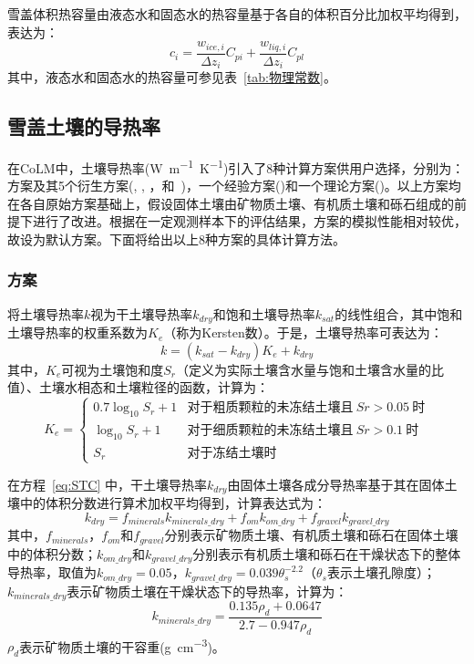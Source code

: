 雪盖体积热容量由液态水和固态水的热容量基于各自的体积百分比加权平均得到，表达为：
\begin{equation}
c_{i}=\frac{w_{ice, i}}{\Delta z_{i}} C_{pi}+\frac{w_{liq, i}}{\Delta z_{i}} C_{pl}
\end{equation}
其中，液态水和固态水的热容量可参见表~\ref{tab:物理常数}。

\subsection{雪盖土壤的导热率}

在CoLM中，土壤导热率(\unit{W.m^{-1}.K^{-1}})引入了8种计算方案供用户选择，分别为：\citet{Johansen1975}方案及其5个衍生方案(\citet{farouki1981thermal}, \citet{cote2005}, \citet{balland2005}，\citet{lu2007improved}和~\citet{Yan2019thermal})，一个经验方案(\citet{tarnawski2012series})和一个理论方案(\citet{de1963thermal})。以上方案均在各自原始方案基础上，假设固体土壤由矿物质土壤、有机质土壤和砾石组成的前提下进行了改进。根据\citep{dai2019evaluation}在一定观测样本下的评估结果，\citet{balland2005}方案的模拟性能相对较优，故设为默认方案。下面将给出以上8种方案的具体计算方法。

\subsubsection{\citet{Johansen1975}方案}
\citet{Johansen1975}将土壤导热率$k$视为干土壤导热率$k_{dry}$和饱和土壤导热率$k_{sat}$的线性组合，其中饱和土壤导热率的权重系数为$K_e$（称为Kersten数）。于是，土壤导热率可表达为：
\begin{equation}\label{eq:STC}
k=(k_{sat}-k_{dry})K_e+k_{dry}
\end{equation}
其中，$K_e$可视为土壤饱和度$S_r$（定义为实际土壤含水量与饱和土壤含水量的比值）、土壤水相态和土壤粒径的函数，计算为：
\begin{equation}
K_e=\begin{cases}
0.7\log_{10}S_r+1 & \text {对于粗质颗粒的未冻结土壤且}\ Sr>0.05\ \text {时} \\ 
\log_{10}S_r+1 & \text {对于细质颗粒的未冻结土壤且}\ Sr>0.1\ \text {时} \\ 
S_r & \text {对于冻结土壤时}
\end{cases}
\end{equation}

在方程~\eqref{eq:STC} 中，干土壤导热率$k_{dry}$由固体土壤各成分导热率基于其在固体土壤中的体积分数进行算术加权平均得到，计算表达式为：
\begin{equation}\label{eq:STC_dry}
k_{dry}=f_{minerals}k_{minerals\_dry}+f_{om}k_{om\_dry}+f_{gravel}k_{gravel\_dry}
\end{equation}
其中，$f_{minerals}$，$f_{om}$和$f_{gravel}$分别表示矿物质土壤、有机质土壤和砾石在固体土壤中的体积分数；$k_{om\_dry}$和$k_{gravel\_dry}$分别表示有机质土壤和砾石在干燥状态下的整体导热率，取值为$k_{om\_dry}=0.05$，$k_{gravel\_dry}=0.039\theta_s^{-2.2}$（$\theta_s$表示土壤孔隙度）；$k_{minerals\_dry}$表示矿物质土壤在干燥状态下的导热率，计算为：$$k_{minerals\_dry}=\frac{0.135\rho_d+0.0647}{2.7-0.947\rho_d}$$
$\rho_d$表示矿物质土壤的干容重(\unit{g.cm^{-3}})。

